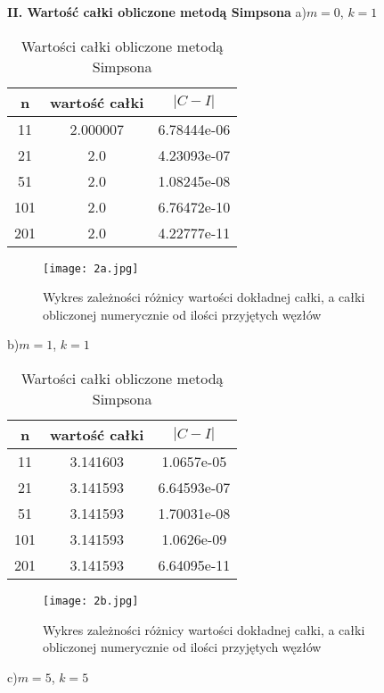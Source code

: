\documentclass{article}
\begin{document}
\newpage
\textbf{II.  Wartość całki obliczone metodą Simpsona}
\newline
a)$m=0$, $k=1$

\begin{table}[H]
\centering
\begin{tabular}{|c|c|c|}
n& wartość całki &  $|C−I|$  \\
\hline
11 & 2.000007 & 6.78444e-06\\ 
21 & 2.0 & 4.23093e-07\\ 
51  & 2.0 & 1.08245e-08\\ 
101  & 2.0 & 6.76472e-10\\ 
201  & 2.0 & 4.22777e-11
\end{tabular}
\caption{Wartości całki obliczone metodą Simpsona}
\end{table}

\begin{figure}[H]
\begin{center}
\texttt{[image: 2a.jpg]}
\caption{Wykres zależności różnicy wartości dokładnej całki, a całki obliczonej numerycznie od ilości przyjętych
węzłów}
\label{pierwszy} 
\end{center}
\end{figure}

b)$m=1$, $k=1$

\begin{table}[H]
\centering
\begin{tabular}{|c|c|c|}
n& wartość całki &  $|C−I|$  \\
\hline
11 & 3.141603 & 1.0657e-05\\ 
21 & 3.141593 & 6.64593e-07\\ 
51  & 3.141593 & 1.70031e-08\\ 
101  & 3.141593 & 1.0626e-09\\ 
201  & 3.141593 & 6.64095e-11
\end{tabular}
\caption{Wartości całki obliczone metodą Simpsona}
\end{table}

\begin{figure}[H]
\begin{center}
\texttt{[image: 2b.jpg]}
\caption{Wykres zależności różnicy wartości dokładnej całki, a całki obliczonej numerycznie od ilości przyjętych
węzłów}
\label{pierwszy} 
\end{center}
\end{figure}

c)$m=5$, $k=5$
\end{document}
